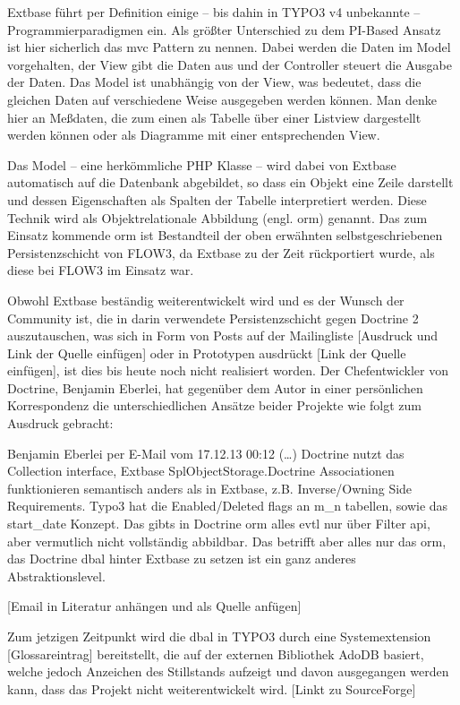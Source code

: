 Extbase führt per Definition einige – bis dahin in TYPO3 v4 unbekannte – Programmierparadigmen ein. Als größter Unterschied zu dem PI-Based Ansatz ist hier sicherlich das \gls{mvc} Pattern zu nennen. Dabei werden die Daten im Model vorgehalten, der View gibt die Daten aus und der Controller steuert die Ausgabe der Daten. Das Model ist unabhängig von der View, was bedeutet, dass die gleichen Daten auf verschiedene Weise ausgegeben werden können. Man denke hier an Meßdaten, die zum einen als Tabelle über einer Listview dargestellt werden können oder als Diagramme mit einer entsprechenden View.

Das Model – eine herkömmliche PHP Klasse – wird dabei von Extbase automatisch auf die Datenbank abgebildet, so dass ein Objekt eine Zeile darstellt und dessen Eigenschaften als Spalten der Tabelle interpretiert werden. Diese Technik wird als Objektrelationale Abbildung (engl. \gls{orm}) genannt. Das zum Einsatz kommende \gls{orm} ist Bestandteil der oben erwähnten selbstgeschriebenen Persistenzschicht von FLOW3, da Extbase zu der Zeit rückportiert wurde, als diese bei FLOW3 im Einsatz war.

Obwohl Extbase beständig weiterentwickelt wird und es der Wunsch der Community ist, die in darin verwendete Persistenzschicht gegen Doctrine 2 auszutauschen, was sich in Form von Posts auf der Mailingliste [Ausdruck und Link der Quelle einfügen] oder in Prototypen ausdrückt [Link der Quelle einfügen], ist dies bis heute noch nicht realisiert worden. Der Chefentwickler von Doctrine, Benjamin Eberlei, hat gegenüber dem Autor in einer persönlichen Korrespondenz die unterschiedlichen Ansätze beider Projekte wie folgt zum Ausdruck gebracht:
\begin{shadequote}{Benjamin Eberlei per E-Mail vom 17.12.13 00:12}
	(\ldots) Doctrine nutzt das Collection interface, Extbase SplObjectStorage.Doctrine Associationen funktionieren semantisch anders als in Extbase, z.B. Inverse/Owning Side Requirements.
	Typo3 hat die Enabled/Deleted flags an m\_n tabellen, sowie das start\_date Konzept. Das gibts in Doctrine \gls{orm} alles evtl nur über Filter \gls{api}, aber vermutlich nicht vollständig abbildbar.
	Das betrifft aber alles nur das \gls{orm}, das Doctrine \gls{dbal} hinter Extbase zu setzen ist ein ganz anderes Abstraktionslevel.
\end{shadequote}
[Email in Literatur anhängen und als Quelle anfügen]

Zum jetzigen Zeitpunkt wird die \gls{dbal} in TYPO3 durch eine Systemextension [Glossareintrag] bereitstellt, die auf der externen Bibliothek AdoDB basiert, welche jedoch Anzeichen des Stillstands aufzeigt und davon ausgegangen werden kann, dass das Projekt nicht weiterentwickelt wird. [Linkt zu SourceForge]

